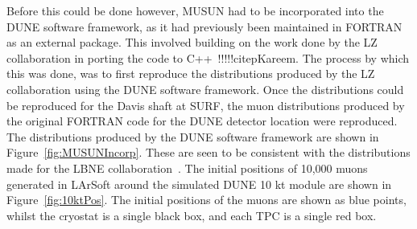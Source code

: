 Before this could be done however, MUSUN had to be incorporated into the DUNE software framework, as it had previously been maintained in FORTRAN as an external package. This involved building on the work done by the LZ collaboration in porting the code to C++~!!!!!citep{Kareem}. The process by which this was done, was to first reproduce the distributions produced by the LZ collaboration using the DUNE software framework. Once the distributions could be reproduced for the Davis shaft at SURF, the muon distributions produced by the original FORTRAN code for the DUNE detector location were reproduced. The distributions produced by the DUNE software framework are shown in Figure~\ref{fig:MUSUNIncorp}. These are seen to be consistent with the distributions made for the LBNE collaboration~\citep{MUSUNLBNE}. The initial positions of 10,000 muons generated in LArSoft around the simulated DUNE 10 kt module are shown in Figure~\ref{fig:10ktPos}. The initial positions of the muons are shown as blue points, whilst the cryostat is a single black box, and each TPC is a single red box. \\

